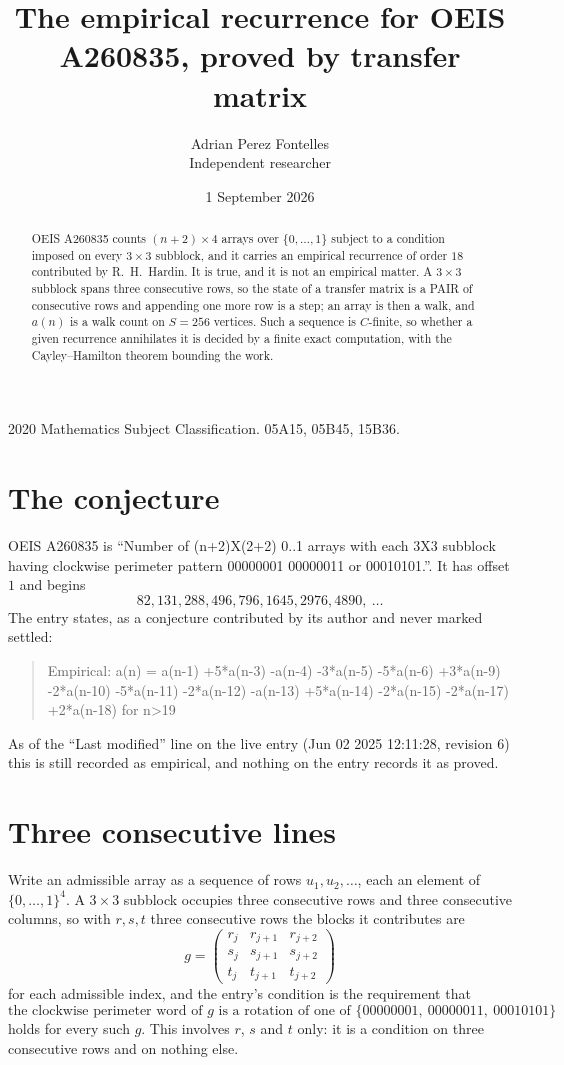 \documentclass[11pt,a4paper]{article}
\title{The empirical recurrence for OEIS A260835, proved by transfer matrix}
\author{Adrian Perez Fontelles\\ \small Independent researcher}
\date{1 September 2026}
\theoremstyle{plain}
\theoremstyle{definition}
\begin{document}
\maketitle

\begin{abstract}
OEIS A260835 counts $(n+2)\times4$ arrays over $\{0,\dots,1\}$ subject to a condition imposed on
every $3\times3$ subblock, and it carries an empirical recurrence of order $18$
contributed by R.~H.~Hardin. It is true, and it is not an empirical matter. A $3\times3$
subblock spans three consecutive rows, so the state of a transfer matrix is a PAIR of
consecutive rows and appending one more row is a step; an array is then a walk, and
$a(n)$ is a walk count on $S=256$ vertices. Such a sequence is $C$-finite, so whether a given
recurrence annihilates it is decided by a finite exact computation, with the Cayley--Hamilton
theorem bounding the work.
\end{abstract}

\noindent\small 2020 Mathematics Subject Classification. 05A15, 05B45, 15B36.\normalsize

\section{The conjecture}

OEIS A260835 is ``Number of (n+2)X(2+2) 0..1 arrays with each 3X3 subblock having clockwise perimeter pattern 00000001 00000011 or 00010101.''. It has offset $1$ and begins
\[
82, 131, 288, 496, 796, 1645, 2976, 4890,\ \dots
\]
The entry states, as a conjecture contributed by its author and never marked settled:
\begin{quote}
Empirical: a(n) = a(n-1) +5*a(n-3) -a(n-4) -3*a(n-5) -5*a(n-6) +3*a(n-9) -2*a(n-10) -5*a(n-11) -2*a(n-12) -a(n-13) +5*a(n-14) -2*a(n-15) -2*a(n-17) +2*a(n-18) for n>19
\end{quote}
As of the ``Last modified'' line on the live entry (Jun 02 2025 12:11:28, revision 6) this is still
recorded as empirical, and nothing on the entry records it as proved.

\section{Three consecutive lines}

Write an admissible array as a sequence of rows $u_1,u_2,\dots$, each an element of
$\{0,\dots,1\}^{4}$. A $3\times3$ subblock occupies three consecutive rows and
three consecutive columns, so with $r,s,t$ three consecutive rows the blocks it
contributes are
\[
g=\begin{pmatrix}r_j&r_{j+1}&r_{j+2}\\ s_j&s_{j+1}&s_{j+2}\\ t_j&t_{j+1}&t_{j+2}\end{pmatrix}
\]
for each admissible index, and the entry's condition is the requirement that
\[
\text{the clockwise perimeter word of }g\text{ is a rotation of one of }\{00000001,\ 00000011,\ 00010101\}
\]
holds for every such $g$. This involves $r$, $s$ and $t$ only: it is a condition on
three consecutive rows and on nothing else.
\end{document}
